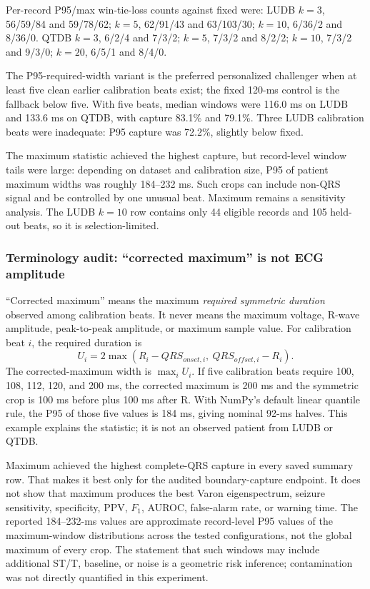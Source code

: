 \documentclass[11pt,a4paper]{article}
\begin{document}
Per-record P95/max win-tie-loss counts against fixed were: LUDB $k=3$, 56/59/84 and 59/78/62; $k=5$, 62/91/43 and 63/103/30; $k=10$, 6/36/2 and 8/36/0. QTDB $k=3$, 6/2/4 and 7/3/2; $k=5$, 7/3/2 and 8/2/2; $k=10$, 7/3/2 and 9/3/0; $k=20$, 6/5/1 and 8/4/0.

The P95-required-width variant is the preferred personalized challenger when at least five clean earlier calibration beats exist; the fixed 120-ms control is the fallback below five. With five beats, median windows were 116.0 ms on LUDB and 133.6 ms on QTDB, with capture 83.1\% and 79.1\%. Three LUDB calibration beats were inadequate: P95 capture was 72.2\%, slightly below fixed.

The maximum statistic achieved the highest capture, but record-level window tails were large: depending on dataset and calibration size, P95 of patient maximum widths was roughly 184--232 ms. Such crops can include non-QRS signal and be controlled by one unusual beat. Maximum remains a sensitivity analysis. The LUDB $k=10$ row contains only 44 eligible records and 105 held-out beats, so it is selection-limited.

\subsubsection{Terminology audit: ``corrected maximum'' is not ECG amplitude}

``Corrected maximum'' means the maximum \emph{required symmetric duration}
observed among calibration beats. It never means the maximum voltage, R-wave
amplitude, peak-to-peak amplitude, or maximum sample value. For calibration
beat $i$, the required duration is
\[
U_i=2\max(R_i-QRS_{onset,i},\ QRS_{offset,i}-R_i).
\]
The corrected-maximum width is $\max_i U_i$. If five calibration beats require
100, 108, 112, 120, and 200 ms, the corrected maximum is 200 ms and the
symmetric crop is 100 ms before plus 100 ms after R. With NumPy's default
linear quantile rule, the P95 of those five values is 184 ms, giving nominal
92-ms halves. This example explains the statistic; it is not an observed
patient from LUDB or QTDB.

Maximum achieved the highest complete-QRS capture in every saved summary row.
That makes it best only for the audited boundary-capture endpoint. It does not
show that maximum produces the best Varon eigenspectrum, seizure sensitivity,
specificity, PPV, $F_1$, AUROC, false-alarm rate, or warning time. The reported
184--232-ms values are approximate record-level P95 values of the
maximum-window distributions across the tested configurations, not the global
maximum of every crop. The statement that such windows may include additional
ST/T, baseline, or noise is a geometric risk inference; contamination was not
directly quantified in this experiment.
\end{document}
